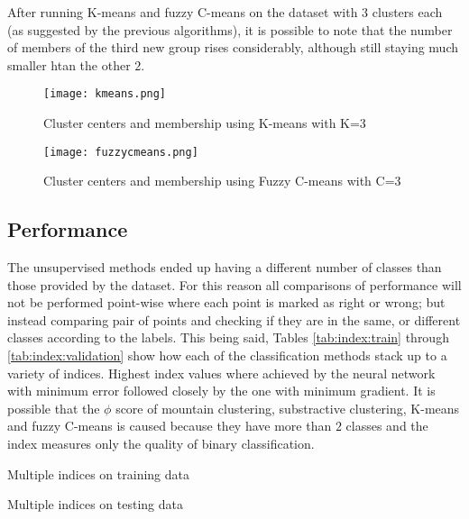 After running K-means and fuzzy C-means on the dataset with $3$ clusters each
(as suggested by the previous algorithms), it is possible to note that the
number of members of the third new group rises considerably, although still
staying much smaller htan the other $2$.

\begin{figure}[t]
    \texttt{[image: kmeans.png]}
    \caption{Cluster centers and membership using K-means with K=3
    \label{fig:kmeans}}
\end{figure}
\begin{figure}[t]
    \texttt{[image: fuzzycmeans.png]}
    \caption{Cluster centers and membership using Fuzzy C-means with C=3 
    \label{fig:fuzzycmeans}}
\end{figure}

\subsection{Performance}

The unsupervised methods ended up having a different number of classes than
those provided by the dataset. For this reason all comparisons of performance
will not be performed point-wise where each point is marked as right or wrong;
but instead comparing pair of points and checking if they are in the same, or
different classes according to the labels. This being said, Tables
\ref{tab:index:train} through \ref{tab:index:validation} show how each of the
classification methods stack up to a variety of indices. Highest index values
where achieved by the neural network with minimum error followed closely by the
one with minimum gradient. It is possible that the $\phi$ score of mountain
clustering, substractive clustering, K-means and fuzzy C-means is caused because
they have more than $2$ classes and the index measures only the quality of
binary classification.

\begin{table*}
    {\csvlinetotablerow}%
    \caption{Multiple indices on training data\label{tab:index:train}}
\end{table*}

\begin{table*}
    {\csvlinetotablerow}%
    \caption{Multiple indices on testing data\label{tab:index:test}}
\end{table*}

